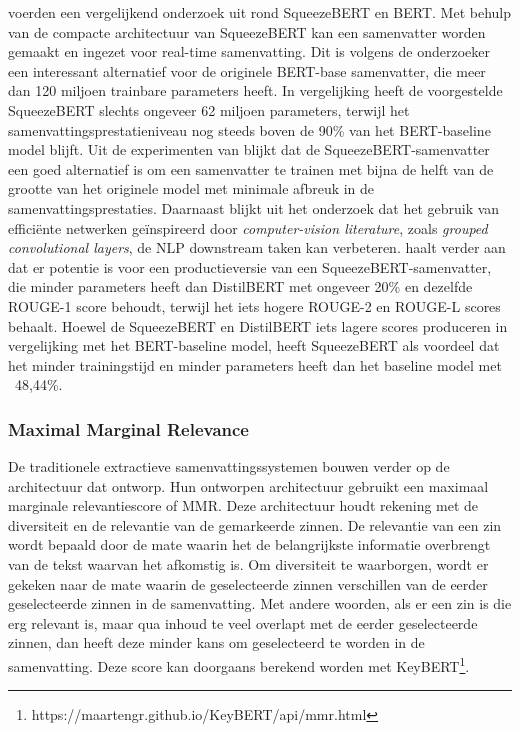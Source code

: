 \textcite{AbdelSalam2022} voerden een vergelijkend onderzoek uit rond SqueezeBERT en BERT. Met behulp van de compacte architectuur van SqueezeBERT kan een samenvatter worden gemaakt en ingezet voor real-time samenvatting. Dit is volgens de onderzoeker een interessant alternatief voor de originele BERT-base samenvatter, die meer dan 120 miljoen trainbare parameters heeft. In vergelijking heeft de voorgestelde SqueezeBERT slechts ongeveer 62 miljoen parameters, terwijl het samenvattingsprestatieniveau nog steeds boven de 90\% van het BERT-baseline model blijft. Uit de experimenten van \textcite{AbdelSalam2022} blijkt dat de SqueezeBERT-samenvatter een goed alternatief is om een samenvatter te trainen met bijna de helft van de grootte van het originele model met minimale afbreuk in de samenvattingsprestaties. Daarnaast blijkt uit het onderzoek dat het gebruik van efficiënte netwerken geïnspireerd door \textit{computer-vision literature}, zoals \textit{grouped convolutional layers}, de NLP downstream taken kan verbeteren.  \textcite{AbdelSalam2022} haalt verder aan dat er potentie is voor een productieversie van een SqueezeBERT-samenvatter, die minder parameters heeft dan DistilBERT met ongeveer 20\% en dezelfde ROUGE-1 score behoudt, terwijl het iets hogere ROUGE-2 en ROUGE-L scores behaalt. Hoewel de SqueezeBERT en DistilBERT iets lagere scores produceren in vergelijking met het BERT-baseline model, heeft SqueezeBERT als voordeel dat het minder trainingstijd en minder parameters heeft dan het baseline model met ~48,44\%. 



\subsubsection{Maximal Marginal Relevance}

De traditionele extractieve samenvattingssystemen bouwen verder op de architectuur dat \textcite{Carbonell1998} ontworp. Hun ontworpen architectuur gebruikt een maximaal marginale relevantiescore of MMR. Deze architectuur houdt rekening met de diversiteit en de relevantie van de gemarkeerde zinnen. De relevantie van een zin wordt bepaald door de mate waarin het de belangrijkste informatie overbrengt van de tekst waarvan het afkomstig is. Om diversiteit te waarborgen, wordt er gekeken naar de mate waarin de geselecteerde zinnen verschillen van de eerder geselecteerde zinnen in de samenvatting. Met andere woorden, als er een zin is die erg relevant is, maar qua inhoud te veel overlapt met de eerder geselecteerde zinnen, dan heeft deze minder kans om geselecteerd te worden in de samenvatting. Deze score kan doorgaans berekend worden met KeyBERT\footnote{https://maartengr.github.io/KeyBERT/api/mmr.html}.

